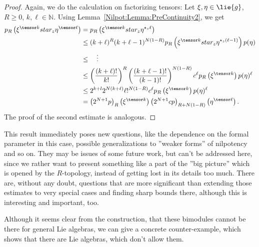 \begin{proof}
	Again, we do the calculation on factorizing tensors: Let 
	$\xi, \eta \in \lie{g}$, $R \geq 0$, $k, \ell \in \mathbb{N}$.
	Using Lemma~\ref{Nilpot:Lemma:PreContinuity2}, we get
	\begin{align*}
		p_R \left(
			\xi^{\tensor k} star_z \eta^{\tensor \ell}
		\right)
		& =
		p_R \left(
			\xi^{\tensor k} star_z 
			\eta^{\star_z \ell}
		\right)
		\\
		& \leq
		(k + \ell)^R
		(k + \ell - 1)^{N (1-R)}
		p_R \left(
			\xi^{\tensor k} star_z 
			\eta^{\star_z (\ell - 1)}
		\right)
		p(\eta)
		\\
		& \leq
		\quad \vdots
		\\
		& \leq
		\left(
			\frac{(k + \ell)!}{k!}
		\right)^R
		\left(
			\frac{(k + \ell - 1)!}{(k - 1)!}
		\right)^{N (1-R)}
		c^{\ell}
		p_R \left( \xi^{\tensor k} \right)
		p(\eta)^{\ell}
		\\
		& \leq
		2^{k + l} 2^{N (k + \ell)}
		\ell!^{N (1-R)}
		c^{\ell}
		p_R \left( \xi^{\tensor k} \right)
		p(\eta)^{\ell}
		\\
		& =
		\left(2^{N + 1} p\right)_R 
		\left( \xi^{\tensor k} \right)
		\left(2^{N + 1} c p\right)_{R + N(1-R)}
		\left( \eta^{\tensor \ell} \right).
	\end{align*}
	The proof of the second estimate is analogous.
\end{proof}
\begin{remark}
	This result immediately poses new questions, like the dependence on the 
	formal parameter in this case, possible generalizations to ''weaker forms'' 
	of nilpotency and so on. They may be issues of some future work, but can't
	be addressed here, since we rather want to present something like a part of 
	the ''big picture'' which is opened by the $R$-topology, instead of getting 
	lost in its details too much. There are, without any doubt, questions that 
	are more significant than extending those estimates to very special cases 
	and 	finding sharp bounds there, although this is interesting and important, 
	too.
\end{remark}
Although it seems clear from the construction, that these bimodules cannot be 
there for general Lie algebras, we can give a concrete counter-example, which 
shows that there are Lie algebras, which don't allow them.
